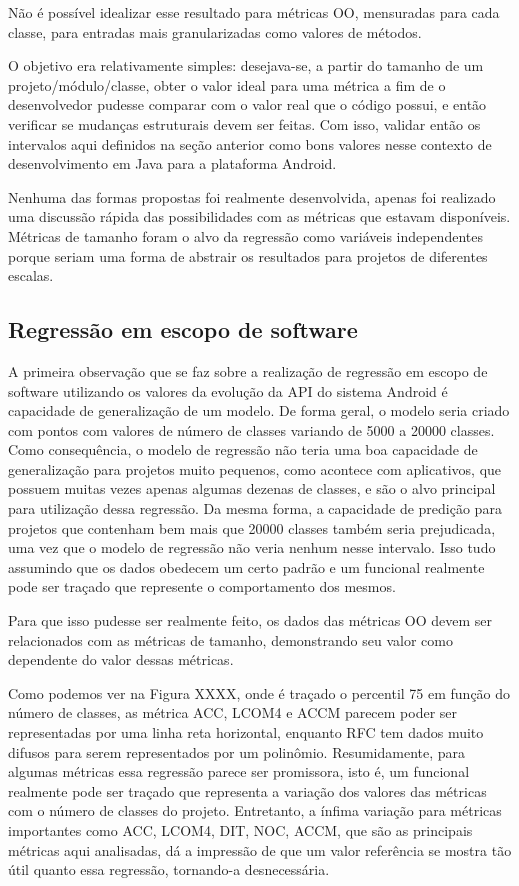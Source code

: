 Não é possível idealizar esse resultado para métricas OO, mensuradas para cada classe, para entradas mais granularizadas como valores de métodos.

O objetivo era relativamente simples: desejava-se, a partir do tamanho de um projeto/módulo/classe, obter o valor ideal para uma métrica a fim de o desenvolvedor pudesse comparar com o valor real que o código possui, e então verificar se mudanças estruturais devem ser feitas. Com isso, validar então os intervalos aqui definidos na seção anterior como bons valores nesse contexto de desenvolvimento em Java para a plataforma Android.

Nenhuma das formas propostas foi realmente desenvolvida, apenas foi realizado uma discussão rápida das possibilidades com as métricas que estavam disponíveis. Métricas de tamanho foram o alvo da regressão como variáveis independentes porque seriam uma forma de abstrair os resultados para projetos de diferentes escalas.

\subsection{Regressão em escopo de software}

A primeira observação que se faz sobre a realização de regressão em escopo de software utilizando os valores da evolução da API do sistema Android é capacidade de generalização de um modelo. De forma geral, o modelo seria criado com pontos com valores de número de classes variando de 5000 a 20000 classes. Como consequência, o modelo de regressão não teria uma boa capacidade de generalização para projetos muito pequenos, como acontece com aplicativos, que possuem muitas vezes apenas algumas dezenas de classes, e são o alvo principal para utilização dessa regressão. Da mesma forma, a capacidade de predição para projetos que contenham bem mais que 20000 classes também seria prejudicada, uma vez que o modelo de regressão não veria nenhum nesse intervalo. Isso tudo assumindo que os dados obedecem um certo padrão e um funcional realmente pode ser traçado que represente o comportamento dos mesmos. 

Para que isso pudesse ser realmente feito, os dados das métricas OO devem ser relacionados com as métricas de tamanho, demonstrando seu valor como dependente do valor dessas métricas.


Como podemos ver na Figura XXXX, onde é traçado o percentil 75 em função do número de classes, as métrica ACC, LCOM4 e ACCM parecem poder ser representadas por uma linha reta horizontal, enquanto RFC tem dados muito difusos para serem representados por um polinômio. Resumidamente, para algumas métricas essa regressão parece ser promissora, isto é, um funcional realmente pode ser traçado que representa a variação dos valores das métricas com o número de classes do projeto. Entretanto, a ínfima variação para métricas importantes como ACC, LCOM4, DIT, NOC, ACCM, que são as principais métricas aqui analisadas, dá a impressão de que um valor referência se mostra tão útil quanto essa regressão, tornando-a desnecessária.

